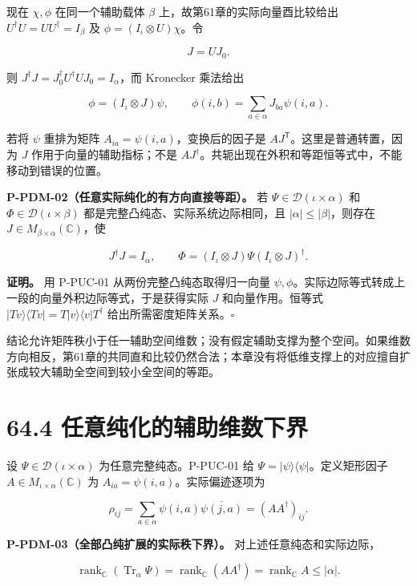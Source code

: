 \documentclass[
  11pt,
  oneside]{book}
\begin{document}
现在 \(\chi,\phi\) 在同一个辅助载体 \(\beta\)
上，故第61章的实际向量酉比较给出 \(U^\dagger U=UU^\dagger=I_\beta\) 及
\(\phi=(I_\iota\otimes U)\chi\)。令

\[
J=UJ_0.
\]

则 \(J^\dagger J=J_0^\dagger U^\dagger UJ_0=I_\alpha\)，而 Kronecker
乘法给出

\[
\phi=(I_\iota\otimes J)\psi,
\qquad
\phi(i,b)=\sum_{a\in\alpha}J_{ba}\psi(i,a).
\]

若将 \(\psi\) 重排为矩阵 \(A_{ia}=\psi(i,a)\)，变换后的因子是
\(AJ^{\mathsf T}\)。这里是普通转置，因为 \(J\)
作用于向量的辅助指标；不是
\(AJ^\dagger\)。共轭出现在外积和等距恒等式中，不能移动到错误的位置。

\protect\hypertarget{p-pdm-02}{}{}

\textbf{P-PDM-02（任意实际纯化的有方向直接等距）。} 若
\(\Psi\in\mathcal D(\iota\times\alpha)\) 和
\(\Phi\in\mathcal D(\iota\times\beta)\)
都是完整凸纯态、实际系统边际相同，且 \(|\alpha|\le|\beta|\)，则存在
\(J\in M_{\beta\times\alpha}(\mathbb C)\)，使

\[
J^\dagger J=I_\alpha,\qquad
\Phi=(I_\iota\otimes J)\Psi(I_\iota\otimes J)^\dagger.
\]

\textbf{证明。} 用 P-PUC-01 从两份完整凸纯态取得归一向量
\(\psi,\phi\)。实际边际等式转成上一段的向量外积边际等式，于是获得实际
\(J\) 和向量作用。恒等式
\(|Tv\rangle\langle Tv|=T|v\rangle\langle v|T^\dagger\)
给出所需密度矩阵关系。\(\square\)

结论允许矩阵秩小于任一辅助空间维数；没有假定辅助支撑为整个空间。如果维数方向相反，第61章的共同直和比较仍然合法；本章没有将低维支撑上的对应擅自扩张成较大辅助全空间到较小全空间的等距。

\section{64.4 任意纯化的辅助维数下界}

设 \(\Psi\in\mathcal D(\iota\times\alpha)\) 为任意完整纯态。P-PUC-01 给
\(\Psi=|\psi\rangle\langle\psi|\)。定义矩形因子
\(A\in M_{\iota\times\alpha}(\mathbb C)\) 为
\(A_{ia}=\psi(i,a)\)。实际偏迹逐项为

\[
\rho_{ij}=
\sum_{a\in\alpha}\psi(i,a)\overline{\psi(j,a)}
=(AA^\dagger)_{ij}.
\]

\protect\hypertarget{p-pdm-03}{}{}

\textbf{P-PDM-03（全部凸纯扩展的实际秩下界）。}
对上述任意纯态和实际边际，

\[
\operatorname{rank}_{\mathbb C}(\operatorname{Tr}_\alpha\Psi)
=\operatorname{rank}_{\mathbb C}(AA^\dagger)
=\operatorname{rank}_{\mathbb C}A
\le |\alpha|.
\]
\end{document}
